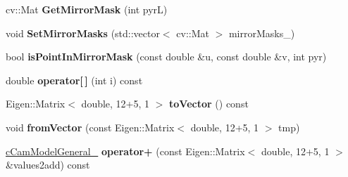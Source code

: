 \begin{DoxyCompactItemize}
\item 
cv\+::\+Mat {\bfseries Get\+Mirror\+Mask} (int pyrL)\hypertarget{classMultiColSLAM_1_1cCamModelGeneral___a252dfece3e794820e78afa2a6ec77887}{}\label{classMultiColSLAM_1_1cCamModelGeneral___a252dfece3e794820e78afa2a6ec77887}

\item 
void {\bfseries Set\+Mirror\+Masks} (std\+::vector$<$ cv\+::\+Mat $>$ mirror\+Masks\+\_\+)\hypertarget{classMultiColSLAM_1_1cCamModelGeneral___a3ea4d6fd99d2db89c6e9eb1e67f476d9}{}\label{classMultiColSLAM_1_1cCamModelGeneral___a3ea4d6fd99d2db89c6e9eb1e67f476d9}

\item 
bool {\bfseries is\+Point\+In\+Mirror\+Mask} (const double \&u, const double \&v, int pyr)\hypertarget{classMultiColSLAM_1_1cCamModelGeneral___aa1625a0b3a7fb2bd62e7f08a0215d076}{}\label{classMultiColSLAM_1_1cCamModelGeneral___aa1625a0b3a7fb2bd62e7f08a0215d076}

\item 
double {\bfseries operator\mbox{[}$\,$\mbox{]}} (int i) const \hypertarget{classMultiColSLAM_1_1cCamModelGeneral___ad69c9340067db19db86034f11f91eda4}{}\label{classMultiColSLAM_1_1cCamModelGeneral___ad69c9340067db19db86034f11f91eda4}

\item 
Eigen\+::\+Matrix$<$ double, 12+5, 1 $>$ {\bfseries to\+Vector} () const \hypertarget{classMultiColSLAM_1_1cCamModelGeneral___ac83caaf398a3bef3dbad982dfe2bbe9d}{}\label{classMultiColSLAM_1_1cCamModelGeneral___ac83caaf398a3bef3dbad982dfe2bbe9d}

\item 
void {\bfseries from\+Vector} (const Eigen\+::\+Matrix$<$ double, 12+5, 1 $>$ tmp)\hypertarget{classMultiColSLAM_1_1cCamModelGeneral___ad4213dbd3649990edb64ca4cb1e8fe5c}{}\label{classMultiColSLAM_1_1cCamModelGeneral___ad4213dbd3649990edb64ca4cb1e8fe5c}

\item 
\hyperlink{classMultiColSLAM_1_1cCamModelGeneral__}{c\+Cam\+Model\+General\+\_\+} {\bfseries operator+} (const Eigen\+::\+Matrix$<$ double, 12+5, 1 $>$ \&values2add) const \hypertarget{classMultiColSLAM_1_1cCamModelGeneral___ae46a62f84b9f3a1d7b567de9595e9942}{}\label{classMultiColSLAM_1_1cCamModelGeneral___ae46a62f84b9f3a1d7b567de9595e9942}

\end{DoxyCompactItemize}
